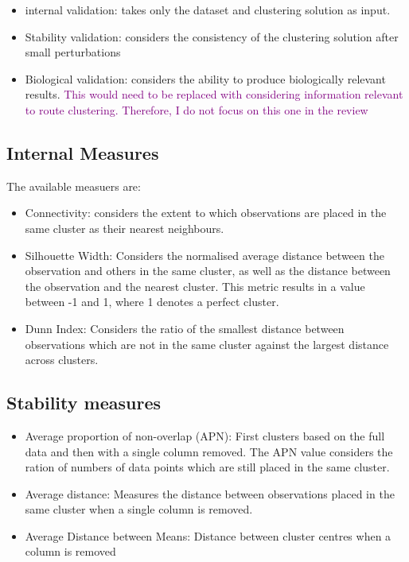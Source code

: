 \documentclass{report}
\newcommand\NOTE[1]{\textcolor{purple}{#1}}
\begin{document}
    \begin{itemize}
        \item internal validation: takes only the dataset and clustering solution as input.
        \item Stability validation: considers the consistency of the clustering solution after small perturbations
        \item Biological validation: considers the ability to produce biologically relevant results. \NOTE{This would need to be replaced with considering information relevant to route clustering. Therefore, I do not focus on this one in the review}
    \end{itemize}



    \subsection{Internal Measures}

    The available measuers are:
    \begin{itemize}
        \item Connectivity: considers the extent to which observations are placed in the same cluster as their nearest neighbours.
        \item Silhouette Width: Considers the normalised average distance between the observation and others in the same cluster, as well as the distance between the observation and the nearest cluster. This metric results in a value between -1 and 1, where 1 denotes a perfect cluster. 
        \item Dunn Index: Considers the ratio of the smallest distance between observations which are not in the same cluster against the largest distance across clusters. 
    \end{itemize}

    \subsection{Stability measures}

    \begin{itemize}
        \item Average proportion of non-overlap (APN): First clusters based on the full data and then with a single column removed. The APN value considers the ration of numbers of data points which are still placed in the same cluster.
        \item Average distance: Measures the distance between observations placed in the same cluster when a single column is removed.
        \item Average Distance between Means: Distance between cluster centres when a column is removed
    \end{itemize}
\end{document}
